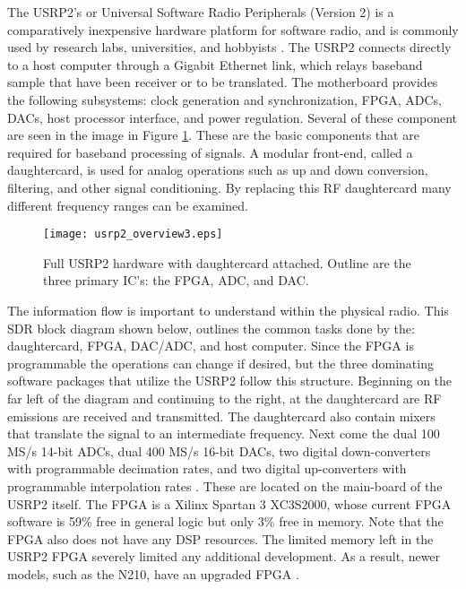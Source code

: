 The USRP2's or Universal Software Radio Peripherals (Version 2) is a comparatively inexpensive hardware platform for software radio, and is commonly used by research labs, universities, and hobbyists \cite{wired}.  The USRP2 connects directly to a host computer through a Gigabit Ethernet link, which relays baseband sample that have been receiver or to be translated.   The motherboard provides the following subsystems: clock generation and synchronization, FPGA, ADCs, DACs, host processor interface, and power regulation. Several of these component are seen in the image in Figure \ref{usrp2_full_hardware}.  These are the basic components that are required for baseband processing of signals. A modular front-end, called a daughtercard, is used for analog operations such as up and down conversion, filtering, and other signal conditioning. By replacing this RF daughtercard many different frequency ranges can be examined.\\

\begin{figure}
\centering
\texttt{[image: usrp2\_overview3.eps]}
\caption{Full USRP2 hardware with daughtercard attached.  Outline are the three primary IC's: the FPGA, ADC, and DAC.}
\label{usrp2_full_hardware}
\end{figure}



The information flow is important to understand within the physical radio.  This SDR block diagram shown below, outlines the common tasks done by the: daughtercard, FPGA, DAC/ADC, and host computer.  Since the FPGA is programmable the operations can change if desired, but the three dominating software packages that utilize the USRP2 follow this structure.  Beginning on the far left of the diagram and continuing to the right, at the daughtercard are RF emissions are received and transmitted.  The daughtercard also contain mixers that translate the signal to an intermediate frequency.  Next come the dual 100 MS/s 14-bit ADCs, dual 400 MS/s 16-bit DACs, two digital down-converters with programmable decimation rates, and two digital up-converters with programmable interpolation rates \cite{USRP2Stats}.  These are located on the main-board of the USRP2 itself.  The FPGA is a Xilinx Spartan 3 XC3S2000, whose current FPGA software is 59\% free in general logic but only 3\% free in memory.  Note that the FPGA also does not have any DSP resources.  The limited memory left in the USRP2 FPGA severely limited any additional development.  As a result, newer models, such as the N210, have an upgraded FPGA \cite{n210spec}.\\

